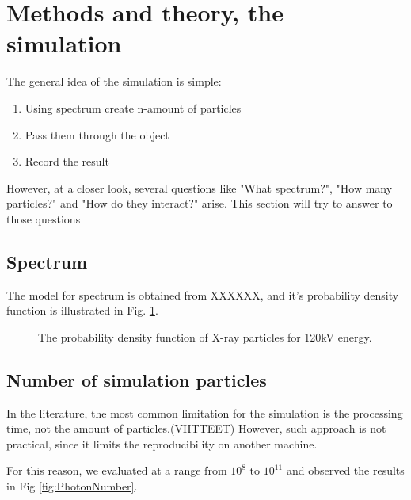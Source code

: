 \documentclass[fleqn,10pt]{SelfArx} %
\begin{document}



\section{Methods and theory, the simulation}


The general idea of the simulation is simple:
\begin{enumerate}[noitemsep]
\item Using spectrum create n-amount of particles
\item Pass them through the object
\item Record the result
\end{enumerate}

However, at a closer look, several questions like "What spectrum?", "How many particles?" and "How do they interact?" arise. This section will try to answer to those questions

\subsection{Spectrum}

The model for spectrum is obtained from XXXXXX, and it's probability density function is illustrated in Fig. \ref{fig:Spectrum}.

\begin{figure}[ht]\centering
\caption{The probability density function of X-ray particles for 120kV energy.}
\label{fig:Spectrum}
\end{figure}


\subsection{Number of simulation particles}

In the literature, the most common limitation for the simulation is the processing time, not the amount of particles.(VIITTEET) However, such approach is not practical, since it limits the reproducibility on another machine.

For this reason, we evaluated at a range from $10^8$ to $10^{11}$ and observed the results in Fig \ref{fig:PhotonNumber}. 
\end{document}

